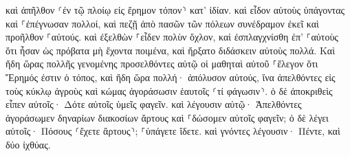 \documentclass{openreader}
\begin{document}
καὶ ἀπῆλθον ⸂ἐν τῷ πλοίῳ εἰς ἔρημον τόπον⸃ κατ’ ἰδίαν. 
καὶ εἶδον αὐτοὺς ὑπάγοντας καὶ ⸀ἐπέγνωσαν πολλοί, καὶ πεζῇ ἀπὸ πασῶν τῶν πόλεων συνέδραμον ἐκεῖ καὶ προῆλθον ⸀αὐτούς. 
καὶ ἐξελθὼν ⸀εἶδεν πολὺν ὄχλον, καὶ ἐσπλαγχνίσθη ἐπ’ ⸀αὐτοὺς ὅτι ἦσαν ὡς πρόβατα μὴ ἔχοντα ποιμένα, καὶ ἤρξατο διδάσκειν αὐτοὺς πολλά. 
Καὶ ἤδη ὥρας πολλῆς γενομένης προσελθόντες αὐτῷ οἱ μαθηταὶ αὐτοῦ ⸀ἔλεγον ὅτι Ἔρημός ἐστιν ὁ τόπος, καὶ ἤδη ὥρα πολλή· 
ἀπόλυσον αὐτούς, ἵνα ἀπελθόντες εἰς τοὺς κύκλῳ ἀγροὺς καὶ κώμας ἀγοράσωσιν ἑαυτοῖς ⸂τί φάγωσιν⸃. 
ὁ δὲ ἀποκριθεὶς εἶπεν αὐτοῖς· Δότε αὐτοῖς ὑμεῖς φαγεῖν. καὶ λέγουσιν αὐτῷ· Ἀπελθόντες ἀγοράσωμεν δηναρίων διακοσίων ἄρτους καὶ ⸀δώσομεν αὐτοῖς φαγεῖν; 
ὁ δὲ λέγει αὐτοῖς· Πόσους ⸂ἔχετε ἄρτους⸃; ⸀ὑπάγετε ἴδετε. καὶ γνόντες λέγουσιν· Πέντε, καὶ δύο ἰχθύας. 
\end{document}
